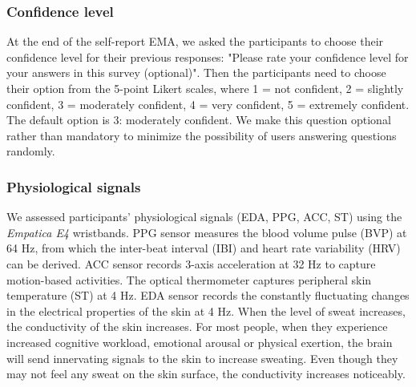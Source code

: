 \documentclass[sigconf]{acmart}
\begin{document}
\subsubsection{Confidence level} At the end of the self-report EMA, we asked the participants to choose their confidence level for their previous responses: "Please rate your confidence level for your answers in this survey (optional)". Then the participants need to choose their option from the 5-point Likert scales, where 1 = not confident, 2 = slightly confident, 3 = moderately confident, 4 = very confident, 5 = extremely confident. The default option is 3: moderately confident. We make this question optional rather than mandatory to minimize the possibility of users answering questions randomly. 


\begin{comment}
\begin{figure}
    \centering
    \texttt{[image: image/EDA.png]}
    \caption{Graphical representation of EDA components}
    \label{fig:edaexample}
\end{figure}
\end{comment}
\subsubsection{Physiological signals}

We assessed participants' physiological signals (EDA, PPG, ACC, ST) using the \textit{Empatica E4} wristbands. PPG sensor measures the blood volume pulse (BVP) at 64 Hz, from which the inter-beat interval (IBI) and heart rate variability (HRV) can be derived. ACC sensor records 3-axis acceleration at 32 Hz to capture motion-based activities. The optical thermometer captures peripheral skin temperature (ST) at 4 Hz.
EDA sensor records the constantly fluctuating changes in the electrical properties of the skin at 4 Hz. When the level of sweat increases, the conductivity of the skin increases. For most people, when they experience increased cognitive workload, emotional arousal or physical exertion, the brain will send innervating signals to the skin to increase sweating. Even though they may not feel any sweat on the skin surface, the conductivity increases noticeably. 
\end{document}
